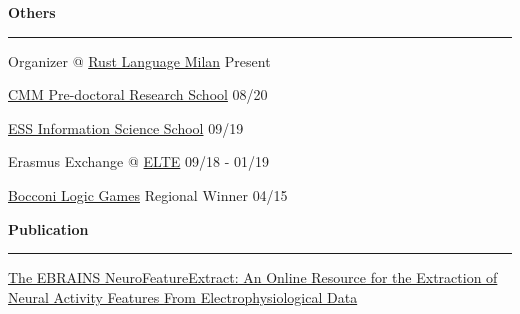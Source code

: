 \documentclass[10pt,letterpaper]{article}
\begin{document}
\begin{justify}
      \begin{minipage}[t]{10.25cm}
            \textbf{Others}\strut
            \hrule
            \vspace{0.2cm}
            \begin{itemize}[label={}, leftmargin=0pt]
                  \begin{item}
                        Organizer @ \href{https://www.meetup.com/rust-language-milan/}{Rust Language Milan}
                        \hfill
                        \small{Present}
                  \end{item}
                  \begin{item}
                        \href{https://cmmrs2020.mpi-sws.org/}{CMM Pre-doctoral Research School}
                        \hfill
                        \small{08/20}
                  \end{item}
                  \begin{item}
                        \href{http://einfose.ffos.hr/summer-school/}{ESS Information Science School}
                        \hfill
                        \small{09/19}
                  \end{item}
                  \begin{item}
                        Erasmus Exchange @ \href{https://www.elte.hu/en/}{ELTE}
                        \hfill
                        \small{09/18 - 01/19}
                  \end{item}
                  \begin{item}
                        \href{https://giochimatematici.unibocconi.eu/}{Bocconi Logic Games} Regional Winner
                        \hfill
                        \small{04/15}
                  \end{item}
            \end{itemize}
      \end{minipage}
      \hfill
      \begin{minipage}[t]{8.05cm}
            \textbf{Publication}\strut
            \hrule
            \vspace{0.2cm}
            \href{https://www.frontiersin.org/articles/10.3389/fninf.2021.713899/full}{The EBRAINS NeuroFeatureExtract: An Online Resource for the Extraction of Neural Activity Features From Electrophysiological Data}
      \end{minipage}

\end{justify}
\end{document}
